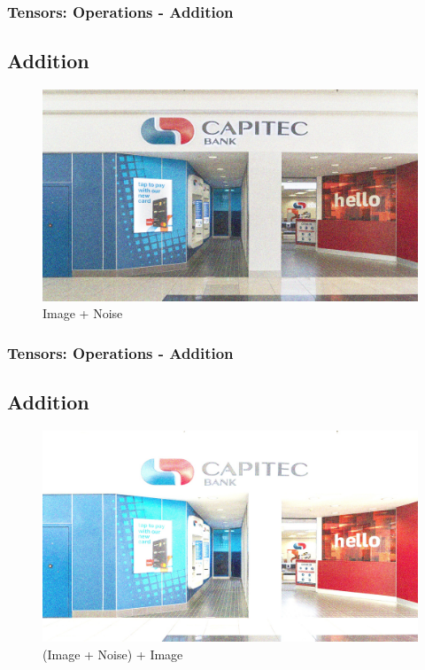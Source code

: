 \documentclass[11pt]{beamer}
\begin{document}
\begin{frame}
	\frametitle{Tensors: Operations - Addition}
	\subsection{Addition}
	\begin{figure}
		\includegraphics[scale=0.17]{"3 - gn_img"}
		\caption{Image + Noise}
	\end{figure}
\end{frame}

\begin{frame}
	\frametitle{Tensors: Operations - Addition}
	\subsection{Addition}
	\begin{figure}
		\includegraphics[scale=0.17]{"4 - gn_img_avg"}
		\caption{(Image + Noise) + Image}
	\end{figure}
\end{frame}
\end{document}
